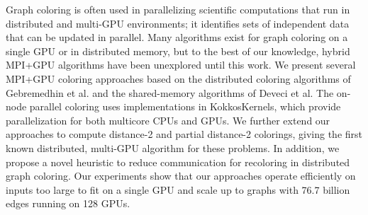 Graph coloring is often used in parallelizing scientific computations that run in distributed and multi-GPU environments; it identifies sets of independent data that can be updated in parallel. 
Many algorithms exist for graph coloring on a single GPU or in distributed memory, but to the best of our knowledge, hybrid MPI+GPU algorithms have been unexplored until this work.
We present several MPI+GPU coloring approaches based on the distributed coloring algorithms of 
Gebremedhin et al. %
and the shared-memory algorithms of 
Deveci et al. %
The on-node parallel coloring uses implementations in 
KokkosKernels, %
 which provide parallelization for both multicore CPUs and GPUs.
We further extend our approaches to compute distance-2 and partial distance-2
colorings, giving the first known distributed, multi-GPU algorithm for these problems.
In addition, we propose a novel heuristic to reduce communication for recoloring in distributed graph coloring. 
Our experiments show that our approaches operate efficiently on inputs too large to fit on a single GPU and scale up to graphs with 76.7 billion edges running on 128 GPUs.



